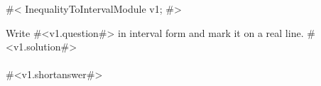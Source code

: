 

#<
InequalityToIntervalModule v1;
#>

Write #<v1.question#> in interval form and mark it on a real line.
#<v1.solution#>
\\
\\

#<v1.shortanswer#>
\\


